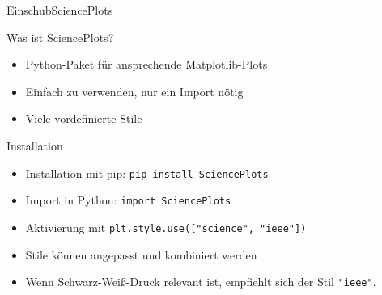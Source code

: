 \documentclass[xelatex,aspectratio=169]{beamer}
\begin{document}
\begin{frame}{Einschub}{SciencePlots}
    \begin{block}{Was ist SciencePlots?}
        \begin{itemize}
            \item Python-Paket für ansprechende Matplotlib-Plots
            \item Einfach zu verwenden, nur ein Import nötig
            \item Viele vordefinierte Stile
        \end{itemize}
    \end{block}

    \begin{block}{Installation}
        \begin{itemize}
            \item Installation mit pip: \texttt{pip install SciencePlots}
            \item Import in Python: \texttt{import SciencePlots}
            \item Aktivierung mit \texttt{plt.style.use(["science", "ieee"])}
            \item Stile können angepasst und kombiniert werden
            \item Wenn Schwarz-Weiß-Druck relevant ist, empfiehlt sich der Stil \texttt{"ieee"}.
        \end{itemize}
    \end{block}

\end{frame}
\end{document}
